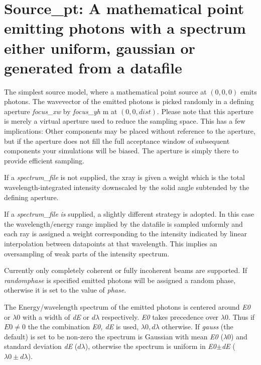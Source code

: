 \section{Source\_pt: A mathematical point emitting photons with a spectrum either uniform, gaussian or generated from a datafile}
\label{source-pt}

The simplest source model, where a mathematical point source at $(0,0,0)$ emits photons. The wavevector of the emitted photons
is picked randomly in a defining aperture \emph{focus\_xw} by \emph{focus\_yh} m at $(0,0,\mathit{dist})$. 
Please note that this aperture is merely a
virtual aperture used to reduce the sampling space. This has a few
implications: Other components may be placed without reference to the aperture,
but if the aperture does not fill the full acceptance window of subsequent
components your simulations will be biased. The aperture is simply there to provide efficient sampling.

If a \textit{spectrum\_file} is not supplied, the xray
is given a weight which is the total wavelength-integrated intensity downscaled
by the solid angle subtended by the defining aperture.

If a \textit{spectrum\_file} \emph{is} supplied, a slightly different strategy is adopted. In this case the
wavelength/energy range implied by the datafile is sampled unformly and each ray is assigned
a weight corresponding to the intensity indicated by linear interpolation between datapoints
at that wavelength. This implies an oversampling of weak parts of the intensity spectrum.

Currently only completely coherent or fully incoherent beams are supported. If
\textit{randomphase} is specified emitted photons will be assigned a random phase, otherwise it is
set to the value of \textit {phase}.

The Energy/wavelength spectrum of the emitted photons is centered around \textit{E0} or  $\lambda 0$ with a width of \textit{dE} or $d\lambda$ respectively. 
\textit{E0} takes precedence over $\lambda0$. Thus if $E0\neq0$ the the combination \textit{E0, dE} is used, $\lambda0,d\lambda$ otherwise.
If \textit{gauss} (the default) is set to be non-zero the spectrum is Gaussian with mean \textit{E0} ($\lambda 0$) and standard deviation \textit{dE} ($d\lambda$), otherwise the
spectrum is uniform in \textit{E0}$\pm$\textit{dE} ($\lambda 0\pm d\lambda$).
